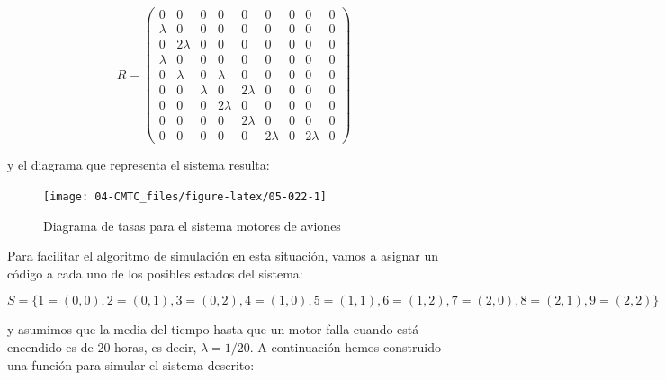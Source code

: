 \documentclass[
]{book}
\theoremstyle{definition}
\theoremstyle{definition}
\theoremstyle{definition}
\theoremstyle{definition}
\theoremstyle{remark}
\begin{document}
\[R = 
\begin{pmatrix}
0 & 0 & 0 & 0 & 0 & 0 & 0 & 0 & 0 \\
\lambda & 0 & 0 & 0 & 0 & 0 & 0 & 0 & 0 \\
0 & 2\lambda & 0 & 0 & 0 & 0 & 0 & 0 & 0 \\
\lambda & 0 & 0 & 0 & 0 & 0 & 0 & 0 & 0 \\
0 & \lambda & 0 & \lambda & 0 & 0 & 0 & 0 & 0 \\
0 & 0 & \lambda & 0 & 2\lambda & 0 & 0 & 0 & 0 \\
0 & 0 & 0 & 2\lambda & 0 & 0 & 0 & 0 & 0 \\
0 & 0 & 0 & 0 & 2\lambda & 0 & 0 & 0 & 0 \\
0 & 0 & 0 & 0 & 0 & 2\lambda & 0 & 2\lambda & 0
\end{pmatrix} \]

y el diagrama que representa el sistema resulta:

\begin{figure}

{\centering \texttt{[image: 04-CMTC\_files/figure-latex/05-022-1]} 

}

\caption{Diagrama de tasas para el sistema motores de aviones}\label{fig:05-022}
\end{figure}

Para facilitar el algoritmo de simulación en esta situación, vamos a asignar un código a cada uno de los posibles estados del sistema:

\[S = \{ 1 = (0, 0), 2 = (0, 1), 3 = (0, 2), 4 = (1, 0), 5 = (1, 1), 6 = (1, 2), 7 = (2, 0), 8 = (2, 1), 9 = (2,2) \}\]

y asumimos que la media del tiempo hasta que un motor falla cuando está encendido es de 20 horas, es decir, \(\lambda = 1/20\). A continuación hemos construido una función para simular el sistema descrito:
\end{document}
